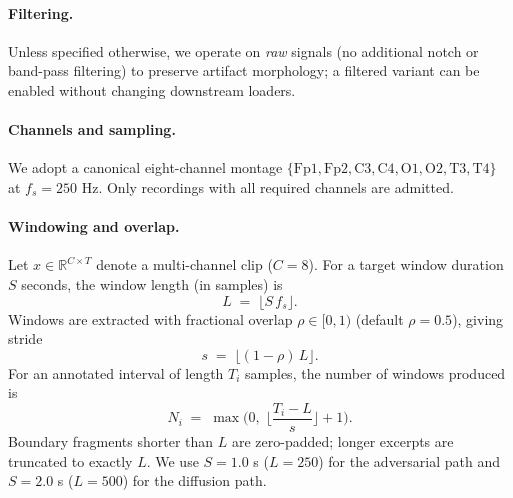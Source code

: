 \documentclass{article}
\begin{document}
\paragraph{Filtering.}
Unless specified otherwise, we operate on \emph{raw} signals (no additional notch or band-pass filtering) to preserve artifact morphology; a filtered variant can be enabled without changing downstream loaders.

\paragraph{Channels and sampling.}
We adopt a canonical eight-channel montage \(\{\text{Fp1}, \text{Fp2}, \text{C3}, \text{C4}, \text{O1}, \text{O2}, \text{T3}, \text{T4}\}\) at \(f_s = 250\) Hz. Only recordings with all required channels are admitted.

\paragraph{Windowing and overlap.}
Let \(x \in \mathbb{R}^{C \times T}\) denote a multi-channel clip (\(C{=}8\)). For a target window duration \(S\) seconds, the window length (in samples) is
\begin{equation}
L \;=\; \big\lfloor S \, f_s \big\rfloor .
\end{equation}
Windows are extracted with fractional overlap \(\rho \in [0,1)\) (default \(\rho{=}0.5\)), giving stride
\begin{equation}
s \;=\; \big\lfloor (1-\rho)\,L \big\rfloor .
\end{equation}
For an annotated interval of length \(T_i\) samples, the number of windows produced is
\begin{equation}
N_i \;=\; \max\!\Big(0,\; \Big\lfloor \frac{T_i - L}{s} \Big\rfloor + 1 \Big).
\end{equation}
Boundary fragments shorter than \(L\) are zero-padded; longer excerpts are truncated to exactly \(L\).
We use \(S{=}1.0\) s (\(L{=}250\)) for the adversarial path and \(S{=}2.0\) s (\(L{=}500\)) for the diffusion path.
\end{document}
